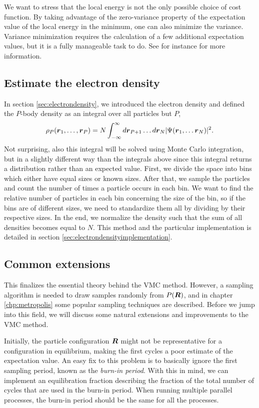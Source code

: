 We want to stress that the local energy is not the only possible choice of cost function. By taking advantage of the zero-variance property of the expectation value of the local energy in the minimum, one can also minimize the variance. Variance minimization requires the calculation of a few additional expectation values, but it is a fully manageable task to do. See for instance \citet{bajdich_electronic_2010} for more information.

\subsection{Estimate the electron density} \label{sec:electrondensityqmc}
In section \ref{sec:electrondensity}, we introduced the electron density and defined the $P$-body density as an integral over all particles but $P$,
\begin{equation}
\rho_P(\boldsymbol{{r}}_1,\hdots,\boldsymbol{{r}}_P)=N\int_{-\infty}^{\infty}d\boldsymbol{{r}}_{P+1}\hdots d\boldsymbol{{r}}_N |\Psi(\boldsymbol{{r}}_1,\hdots \boldsymbol{{r}}_N)|^2.
\end{equation}
Not surprising, also this integral will be solved using Monte Carlo integration, but in a slightly different way than the integrals above since this integral returns a distribution rather than an expected value. First, we divide the space into bins which either have equal sizes or known sizes. After that, we sample the particles and count the number of times a particle occurs in each bin. We want to find the relative number of particles in each bin concerning the size of the bin, so if the bins are of different sizes, we need to standardize them all by dividing by their respective sizes. In the end, we normalize the density such that the sum of all densities becomes equal to $N$. This method and the particular implementation is detailed in section \ref{sec:electrondensityimplementation}.

\subsection{Common extensions}
This finalizes the essential theory behind the VMC method. However, a sampling algorithm is needed to draw samples randomly from $P(\boldsymbol{{R}})$, and in chapter \ref{chp:metropolis} some popular sampling techniques are described. Before we jump into this field, we will discuss some natural extensions and improvements to the VMC method.

Initially, the particle configuration $\boldsymbol{{R}}$ might not be representative for a configuration in equilibrium, making the first cycles a poor estimate of the expectation value. An easy fix to this problem is to basically ignore the first sampling period, known as the \textit{burn-in period}. With this in mind, we can implement an equilibration fraction describing the fraction of the total number of cycles that are used in the burn-in period. When running multiple parallel processes, the burn-in period should be the same for all the processes.

